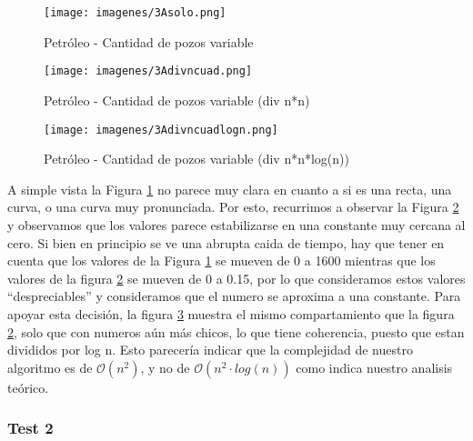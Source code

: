 \begin{figure}[htb]
	\begin{center}
    		\texttt{[image: imagenes/3Asolo.png]}
	\end{center}
	\caption{Petróleo - Cantidad de pozos variable}\label{fig:3Asolo}
\end{figure}

\begin{figure}[htb]
	\begin{center}
    		\texttt{[image: imagenes/3Adivncuad.png]}
	\end{center}
	\caption{Petróleo - Cantidad de pozos variable (div n*n)}\label{fig:3Adivnn}
\end{figure}

\begin{figure}[htb]
	\begin{center}
    		\texttt{[image: imagenes/3Adivncuadlogn.png]}
	\end{center}
	\caption{Petróleo - Cantidad de pozos variable (div n*n*log(n))}\label{fig:3Adivnnlogn}
\end{figure}

A simple vista la Figura \ref{fig:3Asolo} no parece muy clara en cuanto a si es una recta, una curva, o una curva muy pronunciada. Por esto, recurrimos a observar la Figura \ref{fig:3Adivnn} y observamos que los valores parece estabilizarse en una constante muy cercana al cero. Si bien en principio se ve una abrupta caida de tiempo, hay que tener en cuenta que los valores de la Figura \ref{fig:3Asolo} se mueven de 0 a 1600 mientras que los valores de la figura \ref{fig:3Adivnn} se mueven de 0 a 0.15, por lo que consideramos estos valores ``despreciables'' y consideramos que el numero se aproxima a una constante. Para apoyar esta decisión, la figura \ref{fig:3Adivnnlogn} muestra el mismo compartamiento que la figura \ref{fig:3Adivnn}, solo que con numeros aún más chicos, lo que tiene coherencia, puesto que estan divididos por log n. Esto parecería indicar que la complejidad de nuestro algoritmo es de $\mathcal{O}(n^2)$, y no de $\mathcal{O}(n^2 \cdot log(n))$ como indica nuestro analisis teórico.

\vspace*{0.6cm}

\subsubsection{Test 2}

\vspace*{0.3cm}

